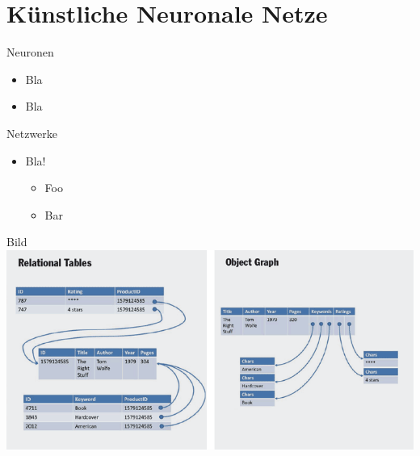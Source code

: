 \section{Künstliche Neuronale Netze}

\begin{slide}{Neuronen}
	\begin{itemize}
		\item Bla
		\item Bla
	\end{itemize}
\end{slide}

\begin{slide}{Netzwerke}
	\begin{itemize}
		\item \alert{Bla!}
		\begin{itemize}
			\item Foo
			\item Bar
		\end{itemize} 
	\end{itemize}
\end{slide}


\begin{slide}{Bild}
	\includegraphics[width=\textwidth,height=0.8\textheight,keepaspectratio]{content/cosql.png}
\end{slide}
